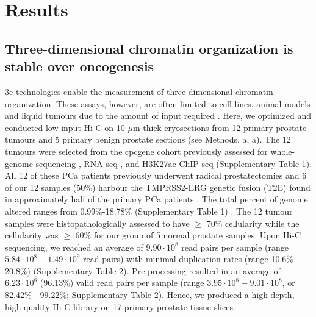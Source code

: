 \section{Results}

\subsection{Three-dimensional chromatin organization is stable over oncogenesis}

\Gls{3c} technologies enable the measurement of three-dimensional chromatin organization.
These assays, however, are often limited to cell lines, animal models and liquid tumours due to the amount of input required \cite{lieberman-aidenComprehensiveMappingLongRange2009}.
Here, we optimized and conducted low-input Hi-C \cite{diazChromatinConformationAnalysis2018} on 10 $\mu$m thick cryosections from 12 primary prostate tumours and 5 primary benign prostate sections (see Methods, a, a).
The 12 tumours were selected from the \gls{cpcgene} cohort previously assessed for whole-genome sequencing \cite{fraserGenomicHallmarksLocalized2017}, RNA-seq \cite{chenWidespreadFunctionalRNA2019}, and H3K27ac ChIP-seq \cite{kronTMPRSS2ERGFusion2017,mazrooeiCistromePartitioningReveals2019} (Supplementary Table 1).
All 12 of these PCa patients previously underwent radical prostatectomies and 6 of our 12 samples (50\%) harbour the TMPRSS2-ERG genetic fusion (T2E) found in approximately half of the primary PCa patients \cite{fraserGenomicHallmarksLocalized2017}.
The total percent of genome altered ranges from 0.99\%-18.78\% (Supplementary Table 1) \cite{fraserGenomicHallmarksLocalized2017}.
The 12 tumour samples were histopathologically assessed to have $\ge$ 70\% cellularity while the cellularity was $\ge$ 60\% for our group of 5 normal prostate samples.
Upon Hi-C sequencing, we reached an average of $9.90 \cdot 10^8$  read pairs per sample (range $5.84 \cdot 10^8 - 1.49 \cdot 10^9$ read pairs) with minimal duplication rates (range 10.6\% - 20.8\%) (Supplementary Table 2).
Pre-processing resulted in an average of $6.23 \cdot 10^8$ (96.13\%) valid read pairs per sample (range $3.95 \cdot 10^8 - 9.01 \cdot 10^8$, or 82.42\% - 99.22\%; Supplementary Table 2).
Hence, we produced a high depth, high quality Hi-C library on 17 primary prostate tissue slices.


